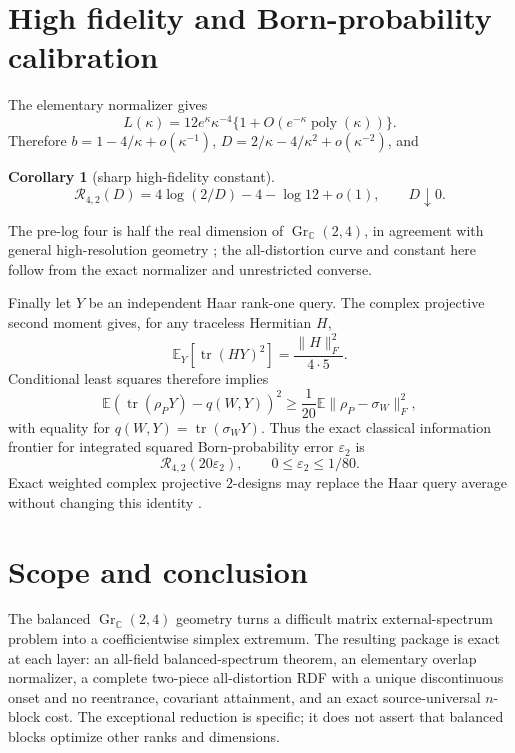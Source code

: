 \documentclass[11pt,a4paper]{article}
\newtheorem{corollary}[theorem]{Corollary}
\newcommand{\Gr}{\operatorname{Gr}_{\mathbb C}}
\newcommand{\tr}{\operatorname{tr}}
\newcommand{\E}{\mathbb E}
\newcommand{\RDF}{\mathcal R_{4,2}}
\begin{document}
\section{High fidelity and Born-probability calibration}

The elementary normalizer gives
\[
L(\kappa)=12e^\kappa\kappa^{-4}\{1+O(e^{-\kappa}\operatorname{poly}(\kappa))\}.
\]
Therefore $b=1-4/\kappa+o(\kappa^{-1})$,
$D=2/\kappa-4/\kappa^2+o(\kappa^{-2})$, and
\begin{corollary}[sharp high-fidelity constant]\label{cor:highrate}
\begin{equation}\label{eq:highrate}
\RDF(D)=4\log(2/D)-4-\log12+o(1),\qquad D\downarrow0.
\end{equation}
\end{corollary}
The pre-log four is half the real dimension of $\Gr(2,4)$, in agreement with general high-resolution geometry \cite{DaiLiuRider2008,PitavalEtAl2016,RieglerKolianderBolcskei2023}; the all-distortion curve and constant here follow from the exact normalizer and unrestricted converse.

Finally let $Y$ be an independent Haar rank-one query.  The complex projective second moment gives, for any traceless Hermitian $H$,
\[
\E_Y[\tr(HY)^2]=\frac{\lVert H\rVert_F^2}{4\cdot5}.
\]
Conditional least squares therefore implies
\[
\E(\tr(\rho_PY)-q(W,Y))^2\ge\frac1{20}\E\lVert\rho_P-\sigma_W\rVert_F^2,
\]
with equality for $q(W,Y)=\tr(\sigma_WY)$.  Thus the exact classical information frontier for integrated squared Born-probability error $\varepsilon_2$ is
\[
\boxed{\RDF(20\varepsilon_2)},\qquad 0\le\varepsilon_2\le1/80.
\]
Exact weighted complex projective $2$-designs may replace the Haar query average without changing this identity \cite{RoyScott2007}.

\section{Scope and conclusion}

The balanced $\Gr(2,4)$ geometry turns a difficult matrix external-spectrum problem into a coefficientwise simplex extremum.  The resulting package is exact at each layer: an all-field balanced-spectrum theorem, an elementary overlap normalizer, a complete two-piece all-distortion RDF with a unique discontinuous onset and no reentrance, covariant attainment, and an exact source-universal $n$-block cost.  The exceptional reduction is specific; it does not assert that balanced blocks optimize other ranks and dimensions.
\end{document}

